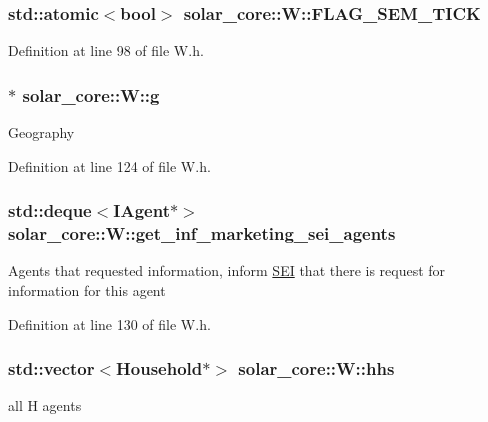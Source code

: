 \subsubsection[{F\+L\+A\+G\+\_\+\+S\+E\+M\+\_\+\+T\+I\+C\+K}]{\setlength{\rightskip}{0pt plus 5cm}std\+::atomic$<$bool$>$ solar\+\_\+core\+::\+W\+::\+F\+L\+A\+G\+\_\+\+S\+E\+M\+\_\+\+T\+I\+C\+K}\label{classsolar__core_1_1_w_ae383b7a595cb28d52aa747fc7e5bb619}


Definition at line 98 of file W.\+h.

\hypertarget{classsolar__core_1_1_w_a9e50ef0da579cdfc3da22c16a492bc44}{}
\subsubsection[{g}]{$\ast$ solar\+\_\+core\+::\+W\+::g}\label{classsolar__core_1_1_w_a9e50ef0da579cdfc3da22c16a492bc44}
Geography 

Definition at line 124 of file W.\+h.

\hypertarget{classsolar__core_1_1_w_a81b5469757f203c9619ff69323ac0f77}{}
\subsubsection[{get\+\_\+inf\+\_\+marketing\+\_\+sei\+\_\+agents}]{\setlength{\rightskip}{0pt plus 5cm}std\+::deque$<${\bf I\+Agent}$\ast$$>$ solar\+\_\+core\+::\+W\+::get\+\_\+inf\+\_\+marketing\+\_\+sei\+\_\+agents\hspace{0.3cm}{\ttfamily [protected]}}\label{classsolar__core_1_1_w_a81b5469757f203c9619ff69323ac0f77}
Agents that requested information, inform \hyperlink{classsolar__core_1_1_s_e_i}{S\+E\+I} that there is request for information for this agent 

Definition at line 130 of file W.\+h.

\hypertarget{classsolar__core_1_1_w_a17c012ff8b17890ed33923cec6d87be3}{}
\subsubsection[{hhs}]{\setlength{\rightskip}{0pt plus 5cm}std\+::vector$<${\bf Household}$\ast$$>$ solar\+\_\+core\+::\+W\+::hhs\hspace{0.3cm}{\ttfamily [protected]}}\label{classsolar__core_1_1_w_a17c012ff8b17890ed33923cec6d87be3}
all H agents 

